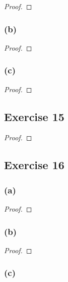 \documentclass[14pt]{extarticle}
\begin{document}
\begin{proof}

\end{proof}

\subsubsection{(b)}

\begin{proof}

\end{proof}

\subsubsection{(c)}

\begin{proof}

\end{proof}

\subsection{Exercise 15}

\begin{proof}

\end{proof}

\subsection{Exercise 16}

\subsubsection{(a)}

\begin{proof}

\end{proof}

\subsubsection{(b)}

\begin{proof}

\end{proof}

\subsubsection{(c)}
\end{document}
